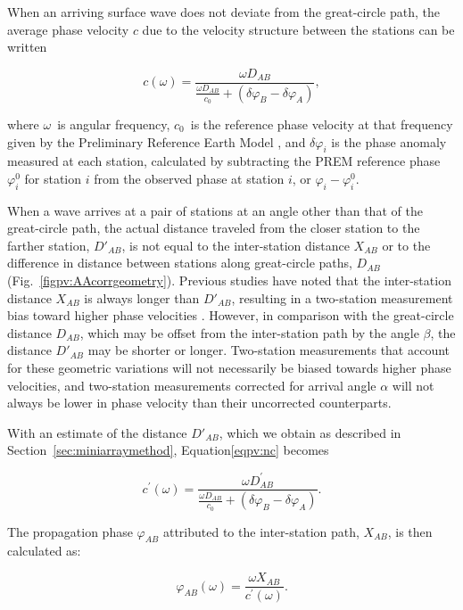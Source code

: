 \documentclass[12pt,oneside]{book}
\begin{document}
When an arriving surface wave does not deviate from the great-circle path, the average phase velocity $c$ due to the velocity structure between the stations can be written
\begin{linenomath*}
\begin{equation}\label{eqpv:nc}
c(\omega) = \frac{\omega D_{AB}}{\frac{\omega D_{AB}}{c_0} + (\delta \varphi_B - \delta \varphi_A)},
\end{equation} 
\end{linenomath*}
where $\omega$\, is angular frequency, $c_0$\, is the reference phase velocity at that frequency given by the Preliminary Reference Earth Model \citep[PREM;][]{PREM}, and $\delta\varphi_{i}$ is the phase anomaly measured at each station, calculated by subtracting the PREM reference phase $\varphi_i^0$ for station $i$ from the observed phase at station $i$, or $\varphi_{i}-\varphi_i^0$. 

When a wave arrives at a pair of stations at an angle other than that of the great-circle path, the actual distance traveled from the closer station to the farther station, $D'_{AB}$, is not equal to the inter-station distance $X_{AB}$ or to the difference in distance between stations along great-circle paths, $D_{AB}$ (Fig.~\ref{figpv:AAcorrgeometry}). Previous studies have noted that the inter-station distance $X_{AB}$ is always longer than $D'_{AB}$, resulting in a two-station measurement bias toward higher phase velocities \citep[e.g.,][]{Yao2006}. However, in comparison with the great-circle distance $D_{AB}$, which may be offset from the inter-station path by the angle $\beta$, the distance $D'_{AB}$ may be shorter or longer. Two-station measurements that account for these geometric variations will not necessarily be biased towards higher phase velocities, and two-station measurements corrected for arrival angle $\alpha$ will not always be lower in phase velocity than their uncorrected counterparts. 

With an estimate of the distance $D'_{AB}$, which we obtain as described in Section~\ref{sec:miniarraymethod}, Equation\ref{eqpv:nc} becomes 
\begin{linenomath*}
\begin{equation}\label{eqpv:wc}
c^{'}(\omega) = \frac{\omega D^{'}_{AB}}{\frac{\omega D_{AB}}{c_0} + (\delta \varphi_B - \delta \varphi_A)}.
\end{equation} 
\end{linenomath*}
The propagation phase $\varphi_{AB}$ attributed to the inter-station path, $X_{AB}$, is then calculated as:
%
\begin{linenomath*}
\begin{equation}
\varphi_{AB}(\omega) = \frac{\omega X_{AB}}{c^{'}(\omega)}.
\end{equation}
\end{linenomath*}
% 
\end{document}
